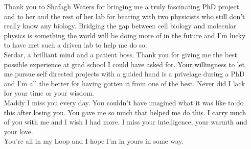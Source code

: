 Thank you to Shafagh Waters for bringing me a truly fascinating PhD project and to her and the rest of her lab for bearing with two physicists who still don't really know any biology. Bridging the gap between cell biology and molecular physics is something the world will be doing more of in the future and I'm lucky to have met such a driven lab to help me do so. \\

Serdar, a brilliant mind and a patient boss. Thank you for giving me the best possible experience at grad school I could have asked for. Your willingness to let me pursue self directed projects with a guided hand is a privelage during a PhD and I'm all the better for having gotten it from one of the best. Never did I lack for your time or your wisdom. \\

Maddy I miss you every day. You couldn't have imagined what it was like to do this after losing you. You gave me so much that helped me do this. I carry much of you with me and I wish I had more. I miss your intelligence, your warmth and your love.\\

You're all in my Loop and I hope I'm in yours in some way.



